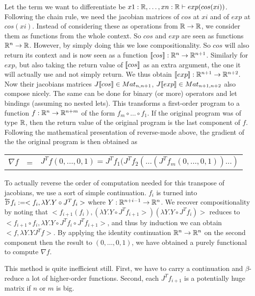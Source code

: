 Let the term we want to differentiate be $x1:\mathbb{R},\ldots,xn:\mathbb{R}\vdash exp(cos(xi))$.
Following the chain rule, we need the jacobian matrices of $cos$ at $xi$ and of $exp$ at $cos(xi)$. 
Instead of considering these as operations from $\mathbb{R}\to\mathbb{R}$, we consider them as functions from the whole context. So $cos$ and $exp$ are seen as functions $\mathbb{R}^n\to\mathbb{R}$.
However, by simply doing this we lose compositionality. 
So $cos$ will also return its context and is now seen as a function $\llbracket cos\rrbracket:\mathbb{R}^n\to\mathbb{R}^{n+1}$.
Similarly for $exp$, but also taking the return value of $\llbracket cos\rrbracket$ as an extra argument, the one it will actually use and not simply return. 
We thus obtain $\llbracket exp\rrbracket:\mathbb{R}^{n+1}\to\mathbb{R}^{n+2}$. Now their jacobians matrices $J\llbracket cos\rrbracket \in Mat_{n,n+1}$, $J\llbracket exp\rrbracket \in Mat_{n+1,n+2}$ also compose nicely.
The same can be done for binary (or more) operators and let bindings (assuming no nested lets). 
This transforms a first-order program to a function $f:\mathbb{R}^n\to\mathbb{R}^{n+m}$ of the form $f_m\circ\ldots\circ f_1$. 
If the original program was of type $\mathbb{R}$, then the return value of the original program is the last component of $f$.
Following the mathematical presentation of reverse-mode above, the gradient of the the original program is then obtained as 
\begin{center}
    \begin{tabular}{r c l}
        $\nabla f$ &=& $J^Tf(0,\ldots,0,1)=J^Tf_1(J^Tf_{2}(\ldots(J^Tf_m(0,\ldots,0,1))\ldots)$
    \end{tabular}
\end{center}

To actually reverse the order of computation needed for this transpose of jacobians, we use a sort of simple continuation.
$f_i$ is turned into $\Dsynrevsymbol{f_i}:=<f_i, \lambda Y. Y\circ J^Tf_i>$ where $Y:\mathbb{R}^{n+i-1}\to \mathbb{R}^n$. 
We recover compositionality by noting that $<f_{i+1}(f_i), (\lambda Y. Y\circ J^Tf_{i+1}>)(\lambda Y. Y\circ J^Tf_i)>$ reduces to
$<f_{i+1}\circ f_i, \lambda Y. Y\circ J^Tf_i \circ J^Tf_{i+1}>$, and thus by induction we can obtain $<f, \lambda Y. YJ^Tf>$.
By applying the identity continuation $\mathbb{R}^n\to\mathbb{R}^n$ on the second component then the result to $(0,\ldots,0,1)$, 
we have obtained a purely functional to compute $\nabla f$. 

This method is quite inefficient still. First, we have to carry a continuation and $\beta$-reduce a lot of higher-order functions.
Second, each $J^Tf_{i+1}$ is a potentially huge matrix if $n$ or $m$ is big.

